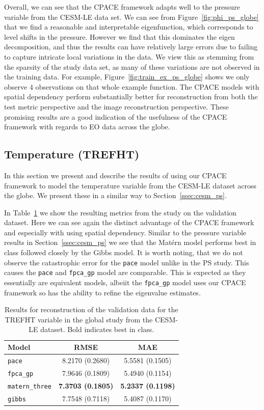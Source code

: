 Overall, we can see that the CPACE framework adapts well to the pressure variable from the CESM-LE data set.
We can see from Figure~\ref{fig:phi_ps_globe} that we find a reasonable and interpretable eigenfunction, which corresponds to level shifts in the pressure.
However we find that this dominates the eigen decomposition, and thus the results can have relatively large errors due to failing to capture intricate local variations in the data.
We view this as stemming from the sparsity of the study data set, as many of these variations are not observed in the training data.
For example, Figure~\ref{fig:train_ex_ps_globe} shows we only observe $4$ observations on that whole example function.
The CPACE models with spatial dependency perform substantially better for reconstruction from both the test metric perspective and the image reconstruction perspective. 
These promising results are a good indication of the usefulness of the CPACE framework with regards to EO data across the globe.

\subsection{Temperature (TREFHT)\label{ssec:cesm_trefht}}
In this section we present and describe the results of using our CPACE framework to model the temperature variable from the CESM-LE dataset across the globe.
We present these in a similar way to Section~\ref{ssec:cesm_ps}.

In Table~\ref{tab:train_cesm_trefht_globe} we show the resulting metrics from the study on the validation dataset.
Here we can see again the distinct advantage of the CPACE framework and especially with using spatial dependency.
Similar to the pressure variable results in Section~\ref{ssec:cesm_ps} we see that the Mat\'ern model performs best in class followed closely by the Gibbs model.
It is worth noting, that we do not observe the catastrophic error for the \verb*|pace| model unlike in the PS study.
This causes the \verb*|pace| and \verb*|fpca_gp| model are comparable.
This is expected as they essentially are equivalent models, albeiit the \verb*|fpca_gp| model uses our CPACE framework so has the ability to refine the eigenvalue estimates.

\begin{table}
	\caption[Results for the TREFHT variable on validation data in the Global study.]{Results for reconstruction of the validation data for the TREFHT variable in the global study from the CESM-LE dataset. Bold indicates best in class.}
	\centering
	\label{tab:train_cesm_trefht_globe}
	\begin{tabular}{lcc}
		\toprule
		\textbf{Model} & \textbf{RMSE} & \textbf{MAE} \\
		\midrule
		\verb*|pace| & 8.2170	(0.2680) & 5.5581 (0.1505) \\
		\verb*|fpca_gp| & 7.9646	(0.1809) & 5.4940 (0.1154) \\
		\verb*|matern_three| & \textbf{7.3703 (0.1805)}& \textbf{5.2337 (0.1198)}\\
		\verb*|gibbs| & 7.7548 (0.7118) & 5.4087 (0.1170)\\
		\bottomrule
	\end{tabular}
\end{table}

